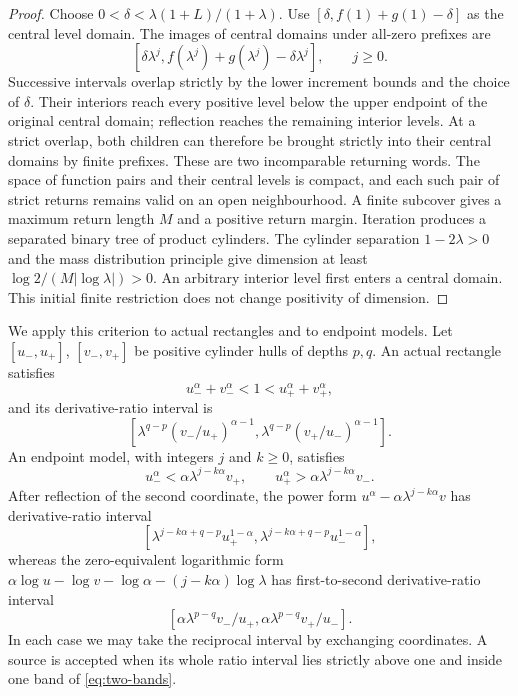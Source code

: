 \begin{proof}
Choose \(0<\delta<\lambda(1+L)/(1+\lambda)\).
Use \([\delta,f(1)+g(1)-\delta]\) as the central level domain.
The images of central domains under all-zero prefixes are
\[
[\delta\lambda^j,
 f(\lambda^j)+g(\lambda^j)-\delta\lambda^j],\qquad j\geq0.
\]
Successive intervals overlap strictly by the lower increment bounds
and the choice of \(\delta\). Their interiors reach every positive
level below the upper endpoint of the original central domain;
reflection reaches the remaining interior levels. At a strict overlap,
both children can therefore be brought strictly into their central
domains by finite prefixes. These are two incomparable returning words.
The space of function pairs and their central levels is compact,
and each such pair of strict returns remains valid on an open
neighbourhood. A finite subcover gives a maximum return length
\(M\) and a positive return margin. Iteration produces a separated
binary tree of product cylinders. The cylinder separation
\(1-2\lambda>0\) and the mass distribution principle give dimension
at least \(\log2/(M|\log\lambda|)>0\). An arbitrary interior level
first enters a central domain. This initial finite restriction
does not change positivity of dimension.
\end{proof}

We apply this criterion to actual rectangles and to endpoint models.
Let \([u_-,u_+]\), \([v_-,v_+]\) be positive cylinder hulls of
depths \(p,q\). An actual rectangle satisfies
\begin{equation}\label{eq:uniform-actual}
u_-^\alpha+v_-^\alpha<1<u_+^\alpha+v_+^\alpha,
\end{equation}
and its derivative-ratio interval is
\[
\left[\lambda^{q-p}(v_-/u_+)^{\alpha-1},
      \lambda^{q-p}(v_+/u_-)^{\alpha-1}\right].
\]
An endpoint model, with integers \(j\) and \(k\geq0\), satisfies
\begin{equation}\label{eq:uniform-endpoint}
u_-^\alpha<\alpha\lambda^{j-k\alpha}v_+,
\qquad u_+^\alpha>\alpha\lambda^{j-k\alpha}v_-.
\end{equation}
After reflection of the second coordinate, the power form
\(u^\alpha-\alpha\lambda^{j-k\alpha}v\) has derivative-ratio interval
\[
\left[\lambda^{j-k\alpha+q-p}u_+^{1-\alpha},
      \lambda^{j-k\alpha+q-p}u_-^{1-\alpha}\right],
\]
whereas the zero-equivalent logarithmic form
\(\alpha\log u-\log v-\log \alpha-(j-k\alpha)\log\lambda\) has
first-to-second derivative-ratio interval
\begin{equation}\label{eq:uniform-log-ratio}
\left[\alpha\lambda^{p-q}v_-/u_+,
      \alpha\lambda^{p-q}v_+/u_-\right].
\end{equation}
In each case we may take the reciprocal interval by exchanging
coordinates. A source is accepted when its whole ratio interval
lies strictly above one and inside one band of \eqref{eq:two-bands}.

